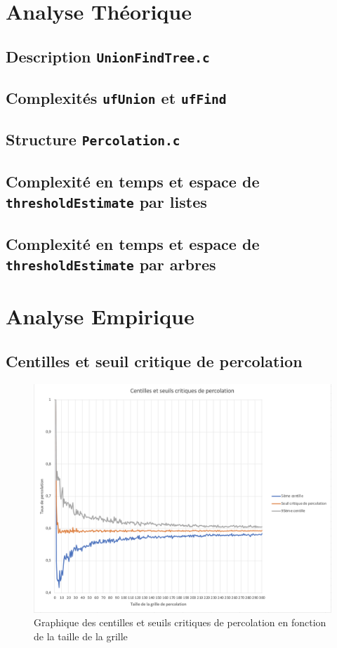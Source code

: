 \documentclass[12pt]{article}
\begin{document}
\section{Analyse Théorique}
\subsection{Description \texttt{UnionFindTree.c}}

\subsection{Complexités \texttt{ufUnion} et \texttt{ufFind}}

\subsection{Structure \texttt{Percolation.c}}

\subsection{Complexité en temps et espace de \texttt{thresholdEstimate} par listes}

\subsection{Complexité en temps et espace de \texttt{thresholdEstimate} par arbres}
\newpage
\section{Analyse Empirique}
\subsection{Centilles et seuil critique de percolation}
\begin{figure}[!h]
    \centering
    \includegraphics[scale = 0.4]{Centilles.png}
    \caption{Graphique des centilles et seuils critiques de percolation en fonction de la taille de la grille}
    \label{fig:centilles_taux}
\end{figure}
\end{document}
